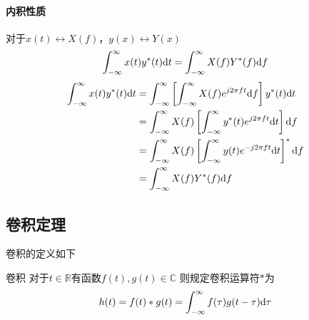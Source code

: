     \paragraph{内积性质}对于$x(t)\leftrightarrow X(f)$，$y(x)\leftrightarrow Y(x)$
    \begin{equation}\label{eq:inner}
        \int_{-\infty}^{\infty}x(t)y^*(t)\text{\upshape d} t=\int_{-\infty}^{\infty}X(f)Y^*(f)\text{\upshape d} f
    \end{equation} 
    \Proof
    \begin{equation*}
        \begin{split}
            \int_{-\infty}^{\infty}x(t)y^*(t)\text{\upshape d} t &= \int_{-\infty}^{\infty}\left[\int_{-\infty}^{\infty}X(f)e^{j2\pi ft}\text{\upshape d} f\right]y^*(t)\text{\upshape d} t\\
                                                    &= \int_{-\infty}^{\infty}X(f)\left[\int_{-\infty}^{\infty}y^*(t)e^{j2\pi ft}\text{\upshape d} t\right]\text{\upshape d} f\\
                                                    &= \int_{-\infty}^{\infty}X(f)\left[\int_{-\infty}^{\infty}y(t)e^{-j2\pi ft}\text{\upshape d} t\right]^*\text{\upshape d} f\\
                                                    &= \int_{-\infty}^{\infty}X(f)Y^*(f)\text{\upshape d} f
        \end{split}
    \end{equation*}

    \subsection{卷积定理}
    卷积的定义如下
    \begin{mydef}{卷积}\label{def:conv}
        对于$t\in\mathbb{R}$有函数$f(t),g(t)\in\mathbb{C}$
        则规定卷积运算符$*$为
        \begin{equation}
            h(t)=f(t)*g(t)=\int_{-\infty}^{\infty}f(\tau)g(t-\tau)\text{\upshape d} \tau
        \end{equation}
    \end{mydef}
